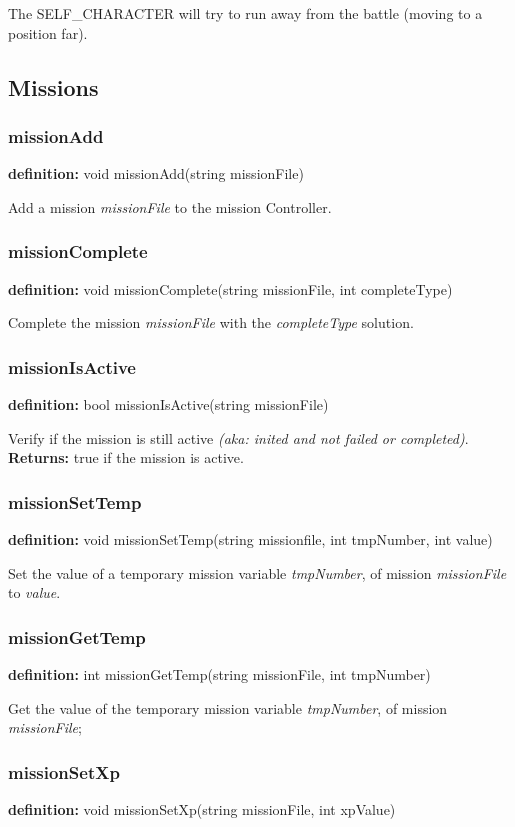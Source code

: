 \documentclass[ letterpaper,12pt]{article}
\begin{document}
The SELF\_CHARACTER will try to run away from the battle (moving to a position
far).


\subsection{Missions}

\subsubsection{missionAdd}
{\bf definition:} void missionAdd(string missionFile)

Add a mission {\it missionFile} to the mission Controller.

\subsubsection{missionComplete}
{\bf definition:} void missionComplete(string missionFile, int completeType)

Complete the mission {\it missionFile} with the {\it completeType} solution.

\subsubsection{missionIsActive}
{\bf definition:} bool missionIsActive(string missionFile)

Verify if the mission is still active {\it (aka: inited and not failed or
completed)}. {\bf Returns: } true if the mission is active.

\subsubsection{missionSetTemp}
{\bf definition:} void missionSetTemp(string missionfile, int tmpNumber, int value)

Set the value of a temporary mission variable {\it tmpNumber}, of mission {\it
missionFile} to {\it value}.


\subsubsection{missionGetTemp}
{\bf definition:} int missionGetTemp(string missionFile, int tmpNumber)

Get the value of the temporary mission variable {\it tmpNumber}, of mission {\it
missionFile};

\subsubsection{missionSetXp}
{\bf definition:} void missionSetXp(string missionFile, int xpValue)
\end{document}
